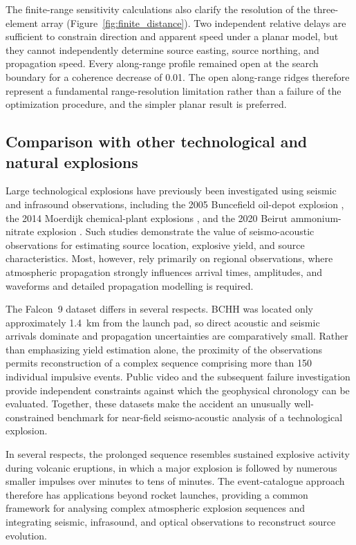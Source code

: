 \documentclass[]{seismica}
\begin{document}
The finite-range sensitivity calculations also clarify the resolution of the
three-element array (Figure~\ref{fig:finite_distance}). Two independent
relative delays are sufficient to constrain direction and apparent speed under
a planar model, but they cannot independently determine source easting, source
northing, and propagation speed. Every along-range profile remained open at
the search boundary for a coherence decrease of 0.01. The open along-range
ridges therefore represent a fundamental range-resolution limitation rather
than a failure of the optimization procedure, and the simpler planar result is
preferred.

\subsection{Comparison with other technological and natural explosions}
\label{sec:discussion_comparison}

Large technological explosions have previously been investigated using
seismic and infrasound observations, including the 2005 Buncefield oil-depot
explosion \citep{ottemoller_2008,green_2008,ceranna_2009}, the 2014 Moerdijk
chemical-plant explosions \citep{smink_2019}, and the 2020 Beirut
ammonium-nitrate explosion
\citep{pilger_beirut_2021,kim_pasyanos_2022}. Such studies demonstrate the value of seismo-acoustic observations for estimating source location, explosive yield, and source characteristics. Most, however, rely primarily on regional observations, where atmospheric propagation strongly influences arrival times, amplitudes, and waveforms and detailed propagation modelling is required.

The Falcon~9 dataset differs in several respects. BCHH was located only approximately 1.4~km from the launch pad, so direct acoustic and seismic arrivals dominate and propagation uncertainties are comparatively small. Rather than emphasizing yield estimation alone, the proximity of the observations permits reconstruction of a complex sequence comprising more than 150 individual impulsive events. Public video and the subsequent failure investigation provide independent constraints against which the geophysical chronology can be evaluated. Together, these datasets make the accident an unusually well-constrained benchmark for near-field seismo-acoustic analysis of a technological explosion.

In several respects, the prolonged sequence resembles sustained explosive activity during volcanic eruptions, in which a major explosion is followed by numerous smaller impulses over minutes to tens of minutes. The event-catalogue approach therefore has applications beyond rocket launches, providing a common framework for analysing complex atmospheric explosion sequences and integrating seismic, infrasound, and optical observations to reconstruct source evolution.
\end{document}
